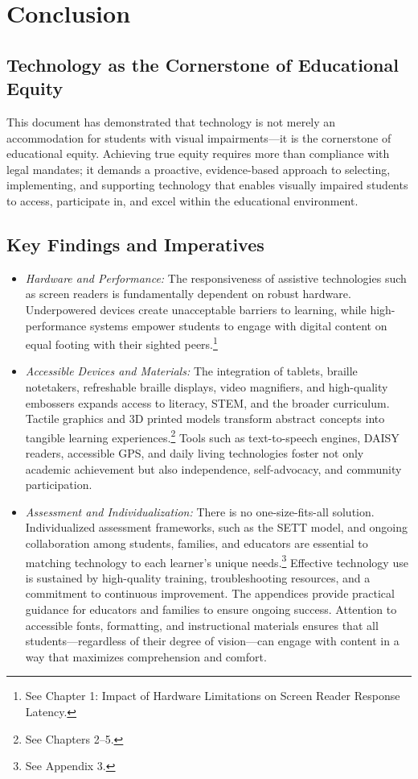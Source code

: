 \chapter{Conclusion}\label{main-conclusion}

\section{Technology as the Cornerstone of Educational Equity}

This document has demonstrated that technology is not merely an accommodation for students with visual impairments—it is the cornerstone of educational equity. Achieving true equity requires more than compliance with legal mandates; it demands a proactive, evidence-based approach to selecting, implementing, and supporting technology that enables visually impaired students to access, participate in, and excel within the educational environment.\cite{IntroductionChapter1}

\section{Key Findings and Imperatives}

\begin{itemize}
    \item \emph{Hardware and Performance:} The responsiveness of assistive technologies such as screen readers is fundamentally dependent on robust hardware. Underpowered devices create unacceptable barriers to learning, while high-performance systems empower students to engage with digital content on equal footing with their sighted peers.\footnote{See Chapter 1: Impact of Hardware Limitations on Screen Reader Response Latency.}
    \item \emph{Accessible Devices and Materials:} The integration of tablets, braille notetakers, refreshable braille displays, video magnifiers, and high-quality embossers expands access to literacy, STEM, and the broader curriculum. Tactile graphics and 3D printed models transform abstract concepts into tangible learning experiences.\footnote{See Chapters 2–5.}
    Tools such as text-to-speech engines, DAISY readers, accessible GPS, and daily living technologies foster not only academic achievement but also independence, self-advocacy, and community participation.\cite{Chapters6to8}
    \item \emph{Assessment and Individualization:} There is no one-size-fits-all solution. Individualized assessment frameworks, such as the SETT model, and ongoing collaboration among students, families, and educators are essential to matching technology to each learner’s unique needs.\footnote{See Appendix 3.}
    Effective technology use is sustained by high-quality training, troubleshooting resources, and a commitment to continuous improvement. The appendices provide practical guidance for educators and families to ensure ongoing success.\cite{Appendices1to4}
    Attention to accessible fonts, formatting, and instructional materials ensures that all students—regardless of their degree of vision—can engage with content in a way that maximizes comprehension and comfort.\cite{Appendix5}
\end{itemize}

